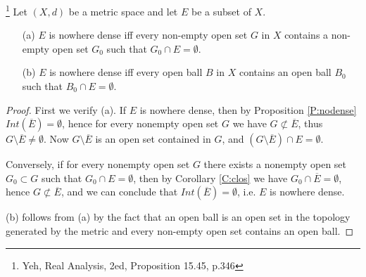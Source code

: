 \begin{proposition} \label{P:nondense}
\footnote{Yeh, Real Analysis, 2ed, Proposition 15.45, p.346}
Let $(X,d)$ be a metric space and let $E$ be a subset of $X$.
\begin{enumerate}
  \item[(a)] $E$ is nowhere dense iff every non-empty open set $G$ in $X$
		contains a non-empty open set $G_0$ such that $G_0\cap E=\emptyset$.
  \item[(b)] $E$ is nowhere dense iff every open ball $B$ in $X$
		contains an open ball $B_0$ such that $B_0\cap E=\emptyset$.
\end{enumerate}
\end{proposition}
\begin{proof}
First we verify (a). If $E$ is nowhere dense, then by Proposition 
\ref{P:nodense} $Int(\overline{E})=\emptyset$, hence for every nonempty open 
set $G$ we have $G\nsubset \overline{E}$, thus 
$G\setminus \overline{E}\neq\emptyset$. Now
$G\setminus \overline{E}$ is an open set contained in $G$, and 
$(G\setminus \overline{E})\cap E=\emptyset$. 

Conversely, if for every nonempty open set $G$ there exists a nonempty open set
$G_0\subset G$ such that $G_0\cap E=\emptyset$, then by Corollary \ref{C:clos}
we have $G_0\cap \overline{E}=\emptyset$, hence $G\nsubset\overline{E}$, and we
can conclude that $Int(\overline{E})=\emptyset$, i.e. $E$ is nowhere dense.

(b) follows from (a) by the fact that an open ball is an open set in the
topology generated by the metric and every non-empty open set contains an open
ball.
\end{proof}

